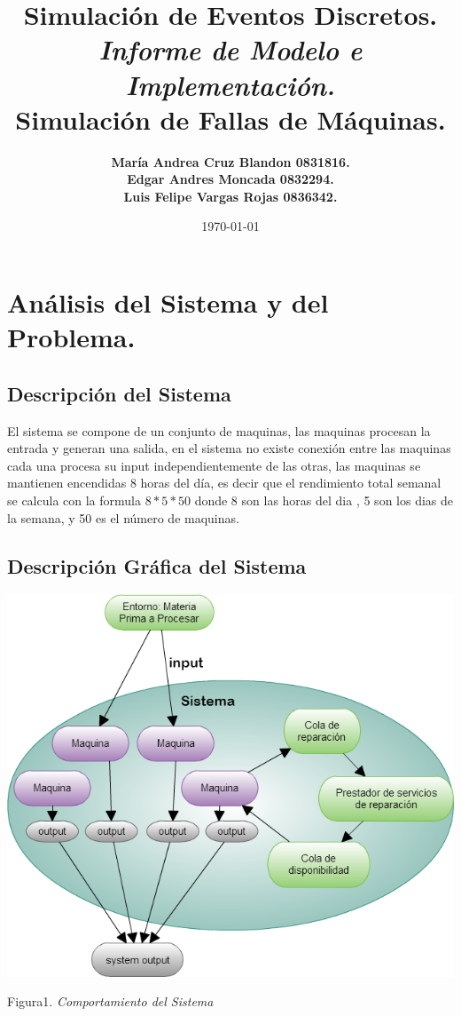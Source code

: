\documentclass[10pt]{article}
\title{Simulación de Eventos Discretos.\\ \emph{Informe de Modelo e Implementación.} \\ \textbf{Simulación de Fallas de Máquinas.} }
\author{\textbf{María Andrea Cruz Blandon  0831816.} \\ \textbf{Edgar Andres Moncada 0832294.  }\\ \textbf{Luis Felipe Vargas Rojas 0836342. }}
\date{\today}
\begin{document}
\maketitle

\section{Análisis del Sistema y del Problema.}
\subsection{Descripción del Sistema}
El sistema se compone de un conjunto de maquinas, las maquinas procesan la entrada y generan una salida, en el  sistema no existe conexión entre las maquinas cada una procesa su input independientemente de las otras, las maquinas se mantienen encendidas 8 horas del día, es decir que el rendimiento total semanal se calcula con la formula $8*5*50$ donde 8 son las  horas del dia , 5 son los dias de la  semana, y 50 es el número de maquinas.
\subsection{Descripción Gráfica del Sistema}
\begin{center}

\includegraphics[scale=0.50]{Simulacion.png}

Figura1. \emph{Comportamiento del Sistema}
\end{center}
\end{document}
